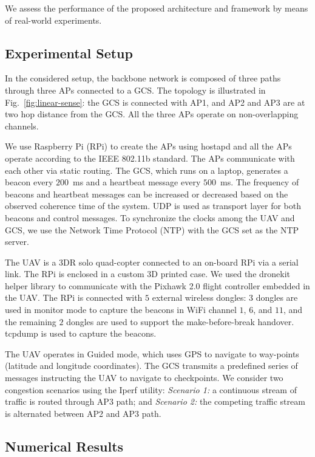 We assess the performance of the proposed architecture and framework by means of real-world experiments.

\subsection{Experimental Setup}
In the considered setup, the backbone network is composed of three paths through three APs connected to a GCS. The topology is illustrated in Fig.~\ref{fig:linear-sense}: the GCS is connected with AP1, and AP2 and AP3 are at two hop distance from the GCS. All the three APs operate on non-overlapping channels. 

We use Raspberry Pi (RPi) to create the APs using hostapd and all the APs operate according to the IEEE 802.11b standard. The APs communicate with each other via static routing. The GCS, which runs on a laptop, generates a beacon every $200$~ms and a heartbeat message every $500$~ms. The frequency of beacons and heartbeat messages can be increased or decreased based on the observed coherence time of the system.
UDP is used as transport layer for both beacons and control messages. To synchronize the clocks among the UAV and GCS, we use the Network Time Protocol (NTP) with the GCS set as the NTP server.

The UAV is a 3DR solo quad-copter connected to an on-board RPi via a serial link. The RPi is enclosed in a custom 3D printed case. We used the dronekit helper library to communicate with the Pixhawk 2.0 flight controller embedded in the UAV. The RPi is connected with $5$ external wireless dongles: $3$ dongles are used in monitor mode to capture the beacons in WiFi channel $1$, $6$, and $11$, and the remaining $2$ dongles are used to support the make-before-break handover. tcpdump is used to capture the beacons.

The UAV operates in Guided mode, which uses GPS to navigate to way-points (latitude and longitude coordinates). The GCS transmits a predefined series of messages instructing the UAV to navigate to checkpoints. We consider two congestion scenarios using the Iperf utility: \emph{Scenario 1:} a continuous stream of traffic is routed through AP3 path; and \emph{Scenario 2:} the competing traffic stream is alternated between AP2 and AP3 path.

\subsection{Numerical Results}

